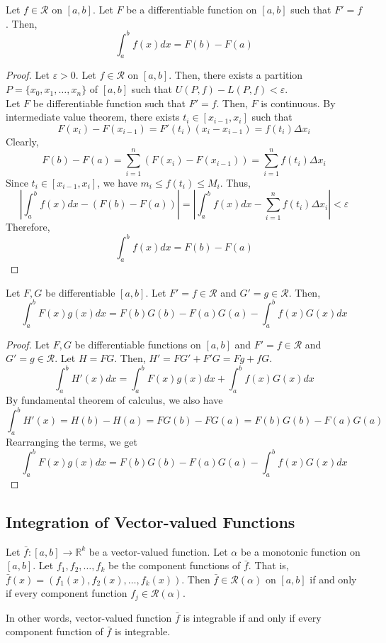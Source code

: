 \begin{theorem}
	Let $f \in\mathscr{R}$ on $[a,b]$.
	Let $F$ be a differentiable function on $[a,b]$ such that $F'=f$.
	Then,
	\[ \int_a^b f(x)dx = F(b)-F(a) \]
\end{theorem}
\begin{proof}
	Let $\varepsilon > 0$.
	Let $f \in \mathscr{R}$ on $[a,b]$.
	Then, there exists a partition $P = \{ x_0,x_1,\dots,x_n\}$ of $[a,b]$ such that $U(P,f)-L(P,f) < \varepsilon$.\\

	Let $F$ be differentiable function such that $F'=f$.
	Then, $F$ is continuous.
	By intermediate value theorem, there exists $t_i \in [x_{i-1},x_i]$ such that 
	\[ F(x_i) - F(x_{i-1}) = F'(t_i) (x_i-x_{i-1}) = f(t_i)\Delta x_i \]
	Clearly,
	\[ F(b) - F(a) = \sum_{i=1}^n \left( F(x_i) - F(x_{i-1}) \right) = \sum_{i=1}^n f(t_i) \Delta x_i \]
	Since $t_i \in [x_{i-1},x_i]$, we have $m_i \le f(t_i) \le M_i$.
	Thus,
	\[ \left| \int_a^b f(x) dx - \left(F(b)-F(a)\right) \right| = \left| \int_a^b f(x) dx - \sum_{i=1}^n f(t_i) \Delta x_i \right| < \varepsilon \]
	Therefore, 
	\[ \int_a^b f(x) dx = F(b) - F(a) \]
\end{proof}

\begin{theorem}
	Let $F,G$ be differentiable $[a,b]$.
	Let $F' = f \in \mathscr{R}$ and $G' = g \in \mathscr{R}$.
	Then,
	\[ \int_a^b F(x)g(x) dx = F(b)G(b) - F(a)G(a) - \int_a^b f(x)G(x) dx \]
\end{theorem}
\begin{proof}
	Let $F,G$ be differentiable functions on $[a,b]$ and $F'=f \in \mathscr{R}$ and $G'=g \in \mathscr{R}$.
	Let $H = FG$. 
	Then, $H' = FG' + F'G = Fg + fG$.
	\[ \int_a^b H'(x) dx = \int_a^b F(x)g(x) dx + \int_a^b f(x)G(x) dx \]
	By fundamental theorem of calculus, we also have
	\[ \int_a^b H'(x) = H(b) - H(a) = FG(b) - FG(a) = F(b)G(b) - F(a)G(a) \]
	Rearranging the terms, we get
	\[ \int_a^b F(x)g(x) dx = F(b)G(b) - F(a)G(a) - \int_a^b f(x)G(x) dx \]
\end{proof}

\subsection{Integration of Vector-valued Functions}
\begin{definition}[integrable]
	Let $\bar{f} : [a,b] \to \mathbb{R}^k$ be a vector-valued function.
	Let $\alpha$ be a monotonic function on $[a,b]$.
	Let $f_1,f_2,\dots,f_k$ be the component functions of $\bar{f}$.
	That is, $\bar{f}(x) = \left( f_1(x),f_2(x),\dots,f_k(x) \right)$.
	Then $\bar{f} \in \mathscr{R}(\alpha)$ on $[a,b]$ if and only if every component function $f_j \in \mathscr{R}(\alpha)$.
\end{definition}
\begin{important}
	In other words, vector-valued function $\bar{f}$ is integrable if and only if every component function of $\bar{f}$ is integrable.
\end{important}

